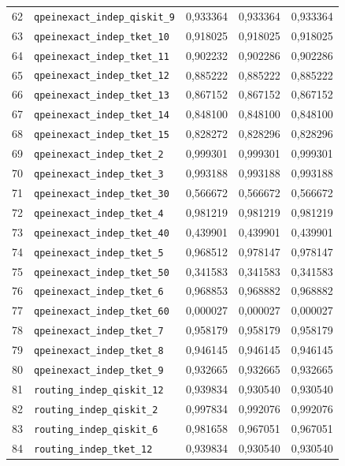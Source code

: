 \documentclass[a4paper,10pt]{article}
\begin{document}
\begin{longtable}{r p{8.2cm} r r r}
62 & \nolinkurl{qpeinexact_indep_qiskit_9} & 0,933364 & 0,933364 & 0,933364\\ 
63 & \nolinkurl{qpeinexact_indep_tket_10} & 0,918025 & 0,918025 & 0,918025\\ 
64 & \nolinkurl{qpeinexact_indep_tket_11} & 0,902232 & 0,902286 & 0,902286\\ 
65 & \nolinkurl{qpeinexact_indep_tket_12} & 0,885222 & 0,885222 & 0,885222\\ 
66 & \nolinkurl{qpeinexact_indep_tket_13} & 0,867152 & 0,867152 & 0,867152\\ 
67 & \nolinkurl{qpeinexact_indep_tket_14} & 0,848100 & 0,848100 & 0,848100\\ 
68 & \nolinkurl{qpeinexact_indep_tket_15} & 0,828272 & 0,828296 & 0,828296\\ 
69 & \nolinkurl{qpeinexact_indep_tket_2} & 0,999301 & 0,999301 & 0,999301\\ 
70 & \nolinkurl{qpeinexact_indep_tket_3} & 0,993188 & 0,993188 & 0,993188\\ 
71 & \nolinkurl{qpeinexact_indep_tket_30} & 0,566672 & 0,566672 & 0,566672\\ 
72 & \nolinkurl{qpeinexact_indep_tket_4} & 0,981219 & 0,981219 & 0,981219\\ 
73 & \nolinkurl{qpeinexact_indep_tket_40} & 0,439901 & 0,439901 & 0,439901\\ 
74 & \nolinkurl{qpeinexact_indep_tket_5} & 0,968512 & 0,978147 & 0,978147\\ 
75 & \nolinkurl{qpeinexact_indep_tket_50} & 0,341583 & 0,341583 & 0,341583\\ 
76 & \nolinkurl{qpeinexact_indep_tket_6} & 0,968853 & 0,968882 & 0,968882\\ 
77 & \nolinkurl{qpeinexact_indep_tket_60} & 0,000027 & 0,000027 & 0,000027\\ 
78 & \nolinkurl{qpeinexact_indep_tket_7} & 0,958179 & 0,958179 & 0,958179\\ 
79 & \nolinkurl{qpeinexact_indep_tket_8} & 0,946145 & 0,946145 & 0,946145\\ 
80 & \nolinkurl{qpeinexact_indep_tket_9} & 0,932665 & 0,932665 & 0,932665\\ 
81 & \nolinkurl{routing_indep_qiskit_12} & 0,939834 & 0,930540 & 0,930540\\ 
82 & \nolinkurl{routing_indep_qiskit_2} & 0,997834 & 0,992076 & 0,992076\\ 
83 & \nolinkurl{routing_indep_qiskit_6} & 0,981658 & 0,967051 & 0,967051\\ 
84 & \nolinkurl{routing_indep_tket_12} & 0,939834 & 0,930540 & 0,930540\\ 

\end{longtable}
\end{document}

